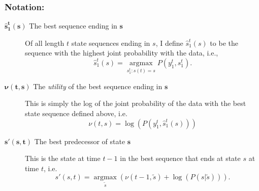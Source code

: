 \documentclass[]{article}
\newcommand{\ts}[3]{#1_{#2}^{#3}}                    %
\newcommand{\argmax}{\operatorname*{argmax}}
\newcommand{\ti}[2]{{#1}{(#2)}}                  %
\newcommand{\ie}{i.e.\xspace}
\begin{document}
\subsubsection*{Notation:}
\begin{description}
\item[$\bm{{\hat s}_1^t(s)}$ The best sequence ending in $\bm{s}$]
  Of all length $t$ state sequences ending in $s$, I define
  $\ts{\hat s}{1}{t}(s)$ to be the sequence with the highest joint
  probability with the data, \ie,
  \begin{equation*}
    \ts{\hat s}{1}{t}(s) = \argmax_{ \ts{s}{1}{t}:\ti{s}{t}=s}
    P\left(\ts{y}{1}{t}, \ts{s}{1}{t} \right).
  \end{equation*}
\item[$\bm{\nu(t,s)}$ The \emph{utility} of the best sequence ending
  in $\bm{s}$] %
  This is simply the log of the joint
  probability of the data with the best state sequence defined above,
  \ie
  \begin{equation*}
    \nu(t,s) = \log\left( P\left(\ts{y}{1}{t}, \ts{\hat s}{1}{t}(s)
      \right) \right)
  \end{equation*}
\item[$\bm{s'(s,t)}$ The best predecessor of state $\bm{s}$] This is
  the state at time $t-1$ in the best sequence that ends at state $s$
  at time $t$, \ie
  \begin{equation*}
    s'(s,t) = \argmax_{\tilde s} \left( \nu(t-1,\tilde s) + \log(
      P(s|\tilde s)) \right).
  \end{equation*}
\end{description}
\end{document}
